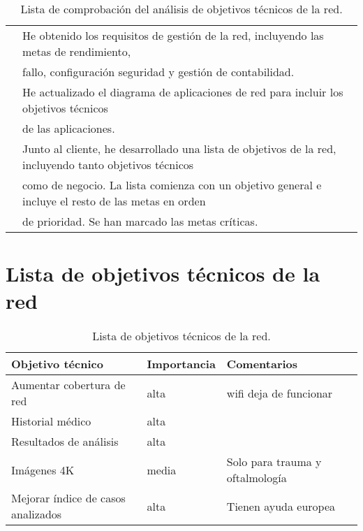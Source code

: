 \begin{table}[H]
\begin{center}
\begin{tabular}{|c|l|}
			 & He obtenido los requisitos de gestión de la red, incluyendo las metas de
			rendimiento, \\
			& fallo, configuración seguridad y gestión de contabilidad.  \\ \hline
			 & He actualizado el diagrama de aplicaciones de red para incluir los objetivos técnicos \\
			 & de las aplicaciones.  \\ \hline
			 & Junto al cliente, he desarrollado una lista de objetivos de la red,
			incluyendo tanto objetivos técnicos \\
			& como de negocio. La lista
			comienza con un objetivo general e incluye el resto de las metas en
			orden \\
			& de prioridad. Se han marcado las metas críticas.  \\ \hline
		\end{tabular}
		\caption{Lista de comprobación del análisis de objetivos técnicos de la red.}
		\label{tabla:tabla2}
	\end{center}
\end{table}

\section{Lista de objetivos técnicos de la red}

\begin{table}[H]
	\begin{center}
		\begin{tabular}{|l|l|l|}
			\hline 
			Objetivo técnico & Importancia & Comentarios \\ 
			\hline \hline
			Aumentar cobertura de red & alta & wifi deja de funcionar \\ \hline
			Historial médico & alta & \\ \hline
			Resultados de análisis & alta & \\ \hline
			Imágenes 4K & media & Solo para trauma y oftalmología \\ \hline	
			Mejorar índice de casos analizados & alta & Tienen ayuda europea \\ \hline	
		\end{tabular}
		\caption{Lista de objetivos técnicos de la red.}
		\label{tabla:tabla4}
	\end{center}
\end{table}

%
%

       
